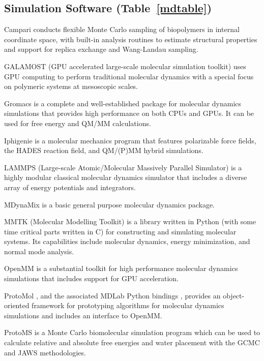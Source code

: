 \subsection*{Simulation Software (Table~\ref{mdtable})}

Campari \cite{Vitalis_2009} conducts flexible Monte Carlo sampling of biopolymers in internal coordinate space, with built-in analysis routines to estimate structural properties and support for replica exchange and Wang-Landau sampling.

GALAMOST (GPU accelerated large-scale molecular simulation toolkit) \cite{Zhu_2013} uses GPU computing to perform traditional molecular dynamics with a special focus on polymeric systems at mesoscopic scales.

Gromacs \cite{Pronk_2013} is a complete and well-established package for molecular dynamics simulations that provides high performance on both CPUs and GPUs.  It can be used for free energy and QM/MM calculations.

Iphigenie \cite{Lorenzen_2012} is a molecular mechanics program that features polarizable force fields, the HADES reaction field, and QM/(P)MM hybrid simulations.

LAMMPS  (Large-scale Atomic/Molecular Massively Parallel Simulator) \cite{Plimpton_1995} is a highly modular classical molecular dynamics simulator that includes a diverse array of energy potentials and integrators.

MDynaMix \cite{Lyubartsev_2000} is a basic general purpose molecular dynamics package.

MMTK (Molecular Modelling Toolkit) \cite{Hinsen_2000} is a library written in Python (with some time critical parts written in C) for constructing and simulating molecular systems.  Its capabilities include molecular dynamics, energy minimization, and normal mode analysis.

OpenMM  \cite{Eastman_2013} is a substantial toolkit for high performance molecular dynamics simulations that includes support for GPU acceleration.

ProtoMol \cite{Matthey_2004}, and the associated MDLab Python bindings \cite{Cickovski_2009}, provides an object-oriented framework for prototyping algorithms for molecular dynamics simulations and includes an interface to OpenMM.

ProtoMS \cite{Michel_2006} is a Monte Carlo biomolecular simulation program which can be used to calculate relative and absolute free energies and water placement with the GCMC and JAWS methodologies.


